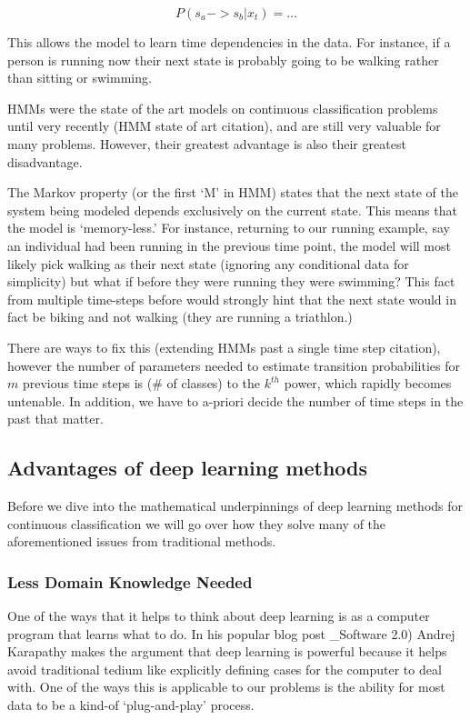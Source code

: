 \documentclass[]{book}
\theoremstyle{definition}
\theoremstyle{definition}
\theoremstyle{definition}
\theoremstyle{remark}
\begin{document}
\[P(s_a -> s_b | x_t) = ...\]

This allows the model to learn time dependencies in the data. For
instance, if a person is running now their next state is probably going
to be walking rather than sitting or swimming.

HMMs were the state of the art models on continuous classification
problems until very recently (HMM state of art citation), and are still
very valuable for many problems. However, their greatest advantage is
also their greatest disadvantage.

The Markov property (or the first `M' in HMM) states that the next state
of the system being modeled depends exclusively on the current state.
This means that the model is `memory-less.' For instance, returning to
our running example, say an individual had been running in the previous
time point, the model will most likely pick walking as their next state
(ignoring any conditional data for simplicity) but what if before they
were running they were swimming? This fact from multiple time-steps
before would strongly hint that the next state would in fact be biking
and not walking (they are running a triathlon.)

There are ways to fix this (extending HMMs past a single time step
citation), however the number of parameters needed to estimate
transition probabilities for \(m\) previous time steps is (\# of
classes) to the \(k^{th}\) power, which rapidly becomes untenable. In
addition, we have to a-priori decide the number of time steps in the
past that matter.

\subsection{Advantages of deep learning
methods}\label{advantages-of-deep-learning-methods}

Before we dive into the mathematical underpinnings of deep learning
methods for continuous classification we will go over how they solve
many of the aforementioned issues from traditional methods.

\subsubsection{Less Domain Knowledge
Needed}\label{less-domain-knowledge-needed}

One of the ways that it helps to think about deep learning is as a
computer program that learns what to do. In his popular blog post
\_Software 2.0) Andrej Karapathy makes the argument that deep learning
is powerful because it helps avoid traditional tedium like explicitly
defining cases for the computer to deal with. One of the ways this is
applicable to our problems is the ability for most data to be a kind-of
`plug-and-play' process.
\end{document}
